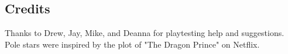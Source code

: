 \documentclass[10pt,oneside,letterpaper,landscape]{memoir}
\begin{document}
\begin{multicols}{3}
\section{Credits}

Thanks to Drew, Jay, Mike, and Deanna for playtesting help and suggestions.
Pole stars were inspired by the plot of "The Dragon Prince" on Netflix.

\end{multicols}

\end{document}
